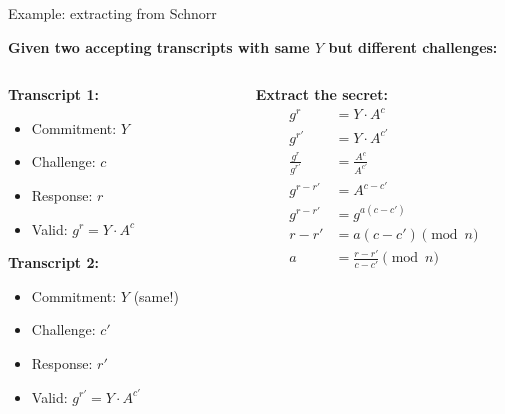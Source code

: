 \documentclass[aspectratio=169, lualatex, handout]{beamer}
\begin{document}
\begin{frame}{Example: extracting from Schnorr}
	\begin{center}
		\textbf{Given two accepting transcripts with same $Y$ but different challenges:}
	\end{center}
	\vspace{0.5em}
	\begin{columns}[c]
		\begin{column}{0.5\textwidth}
			\textbf{Transcript 1:}
			\begin{itemize}
				\item Commitment: $Y$
				\item Challenge: $c$
				\item Response: $r$
				\item Valid: $g^r = Y \cdot A^c$
			\end{itemize}
			\textbf{Transcript 2:}
			\begin{itemize}
				\item Commitment: $Y$ (same!)
				\item Challenge: $c'$
				\item Response: $r'$
				\item Valid: $g^{r'} = Y \cdot A^{c'}$
			\end{itemize}
		\end{column}
		\begin{column}{0.5\textwidth}
			\textbf{Extract the secret:}
			\begin{align*}
				g^r                & = Y \cdot A^c                \\
				g^{r'}             & = Y \cdot A^{c'}             \\
				\frac{g^r}{g^{r'}} & = \frac{A^c}{A^{c'}}         \\
				g^{r-r'}           & = A^{c-c'}                   \\
				g^{r-r'}           & = g^{a(c-c')}                \\
				r-r'               & = a(c-c') \pmod{n}           \\
				a                  & = \frac{r-r'}{c-c'} \pmod{n}
			\end{align*}
		\end{column}
	\end{columns}
\end{frame}
\end{document}
